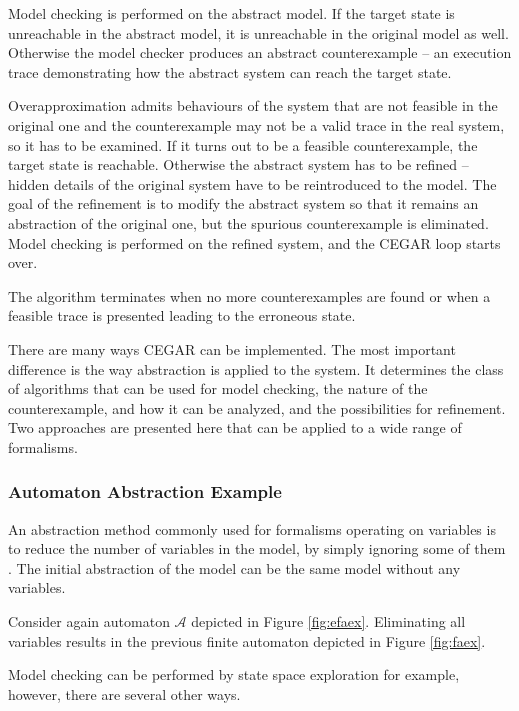 Model checking is performed on the abstract model. If the target state is
unreachable in the abstract model, it is unreachable in the original model
as well. Otherwise the model checker produces an abstract counterexample -- an execution trace demonstrating how the abstract
system can reach the target state. 

Overapproximation admits behaviours of the system that are not feasible in the original one and the counterexample may not be a valid trace in the real system, so it has to be examined.
If it turns out to be a feasible counterexample, the target state is reachable. Otherwise
the abstract system has to be refined -- hidden details of the original system have to be reintroduced to the model. The goal of the refinement is to modify the abstract
system so that it remains an abstraction of the original one, but the spurious
counterexample is eliminated.  Model checking is performed on the
refined system, and the CEGAR loop starts over. 

The algorithm terminates when no more
counterexamples are found or when a feasible trace is
presented leading to the erroneous state.

There are many ways CEGAR can be implemented. The most important difference is the way abstraction is applied to the system. It determines the class of algorithms that can be used for model checking, the nature of the counterexample, and how it can be analyzed, and the possibilities for refinement. Two approaches are presented here that can be applied to a wide range of formalisms.

\subsubsection{Automaton Abstraction Example} \label{sec:cegarex1}

An abstraction method commonly used for formalisms operating on variables is to reduce the number of variables in the model, by simply ignoring some of them \cite{Clarke:1994:MCA}. The initial abstraction of the model can be the same model without any variables.
 
 \begin{example}
 	Consider again automaton $\mathcal{A}$ depicted in Figure \ref{fig:efaex}. Eliminating all variables results in the previous finite automaton depicted in Figure \ref{fig:faex}.
 \end{example}

Model checking can be performed by state space exploration for example, however, there are several other ways.

